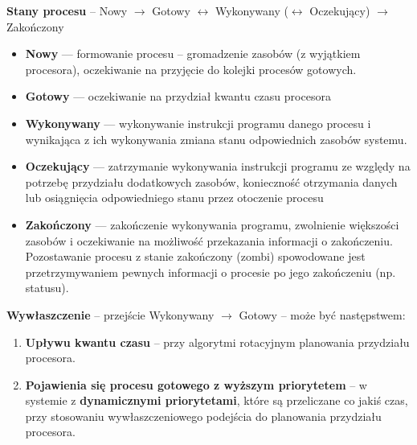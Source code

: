 \documentclass[main.tex]{subfiles}
\begin{document}
    \noindent \textbf{Stany procesu} -- Nowy $\rightarrow$ Gotowy $\leftrightarrow$ Wykonywany
    ($\leftrightarrow$ Oczekujący) $\rightarrow$ Zakończony
    \begin{itemize}[noitemsep]
        \item \textbf{Nowy} — formowanie procesu -- gromadzenie zasobów (z wyjątkiem procesora),
        oczekiwanie na przyjęcie do kolejki procesów gotowych.

        \item \textbf{Gotowy} — oczekiwanie na przydział kwantu czasu procesora

        \item \textbf{Wykonywany} — wykonywanie instrukcji programu danego procesu i wynikająca z ich wykonywania zmiana
        stanu odpowiednich zasobów systemu.

        \item \textbf{Oczekujący} — zatrzymanie wykonywania instrukcji programu ze względy na potrzebę przydziału
        dodatkowych zasobów, konieczność otrzymania danych lub osiągnięcia odpowiedniego stanu przez otoczenie procesu

        \item \textbf{Zakończony} — zakończenie wykonywania programu, zwolnienie większości zasobów i oczekiwanie na
        możliwość przekazania informacji o zakończeniu.
        Pozostawanie procesu z stanie zakończony (zombi) spowodowane jest przetrzymywaniem pewnych informacji o
        procesie po jego zakończeniu (np. statusu).
    \end{itemize}

    \noindent \textbf{Wywłaszczenie} -- przejście Wykonywany $\rightarrow$ Gotowy -- może być następstwem:
    \begin{enumerate}[noitemsep]
        \item \textbf{Upływu kwantu czasu} -- przy algorytmi rotacyjnym planowania przydziału procesora.
        \item \textbf{Pojawienia się procesu gotowego z wyższym priorytetem} -- w systemie z \textbf{dynamicznymi
        priorytetami}, które są przeliczane co jakiś czas, przy stosowaniu wywłaszczeniowego podejścia do planowania
        przydziału procesora.
    \end{enumerate}
\end{document}

